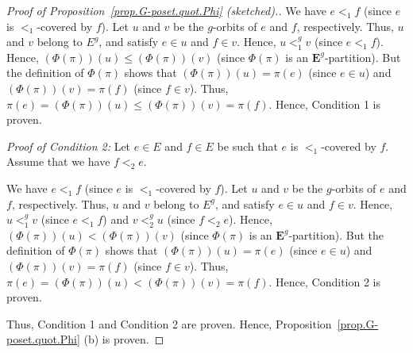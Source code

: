 \documentclass[12pt]{article}
\theoremstyle{plain}
\theoremstyle{definition}
\theoremstyle{remark}
\newcommand{\EE}{{\mathbf{E}}}
\begin{document}
\begin{proof}[Proof of Proposition~\ref{prop.G-poset.quot.Phi} (sketched).]
We have $e<_{1}f$ (since $e$ is $<_{1}$-covered by $f$). Let $u$ and $v$ be
the $g$-orbits of $e$ and $f$, respectively. Thus, $u$ and $v$ belong to
$E^{g}$, and satisfy $e \in u$ and $f \in v$. Hence,
$u<_{1}^g v$ (since $e<_{1}f$). Hence, $\left(  \Phi\left(
\pi\right)  \right)  \left(  u\right)  \leq\left(  \Phi\left(  \pi\right)
\right)  \left(  v\right)  $ (since $\Phi\left(  \pi\right)  $ is an
$\EE^{g}$-partition). But the definition of $\Phi\left(  \pi\right)  $
shows that $\left(  \Phi\left(  \pi\right)  \right)  \left(  u\right)
=\pi\left(  e\right)  $ (since $e\in u$) and $\left(  \Phi\left(  \pi\right)
\right)  \left(  v\right)  =\pi\left(  f\right)  $ (since $f\in v$). Thus,
$\pi\left(  e\right)  =\left(  \Phi\left(  \pi\right)  \right)  \left(
u\right)  \leq\left(  \Phi\left(  \pi\right)  \right)  \left(  v\right)
=\pi\left(  f\right)  $. Hence, Condition 1 is proven.

\textit{Proof of Condition 2:} Let $e\in E$ and $f\in E$ be such that $e$ is
$<_{1}$-covered by $f$. Assume that we have $f<_{2}e$.

We have $e<_{1}f$ (since $e$ is $<_{1}$-covered by $f$). Let $u$ and $v$ be
the $g$-orbits of $e$ and $f$, respectively. Thus, $u$ and $v$ belong to
$E^{g}$, and satisfy $e \in u$ and $f \in v$. Hence,
$u<_{1}^g v$ (since $e<_{1}f$) and $v<_{2}^g u$ (since
$f<_{2}e$). Hence, $\left(  \Phi\left(  \pi\right)  \right)  \left(  u\right)
<\left(  \Phi\left(  \pi\right)  \right)  \left(  v\right)  $ (since
$\Phi\left(  \pi\right)  $ is an $\EE^{g}$-partition). But the
definition of $\Phi\left(  \pi\right)  $ shows that $\left(  \Phi\left(
\pi\right)  \right)  \left(  u\right)  =\pi\left(  e\right)  $ (since $e\in
u$) and $\left(  \Phi\left(  \pi\right)  \right)  \left(  v\right)
=\pi\left(  f\right)  $ (since $f\in v$). Thus, $\pi\left(  e\right)  =\left(
\Phi\left(  \pi\right)  \right)  \left(  u\right)  <\left(  \Phi\left(
\pi\right)  \right)  \left(  v\right)  =\pi\left(  f\right)  $. Hence,
Condition 2 is proven.

Thus, Condition 1 and Condition 2 are proven. Hence,
Proposition~\ref{prop.G-poset.quot.Phi} (b) is proven.



\end{proof}
\end{document}
